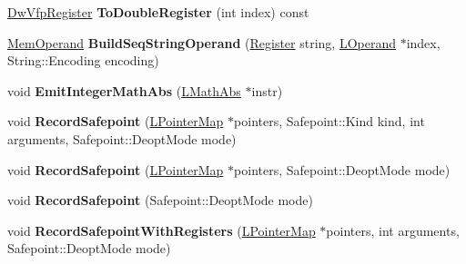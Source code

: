 \begin{DoxyCompactItemize}
\item 
\hyperlink{structv8_1_1internal_1_1_double_register}{Dw\+Vfp\+Register} {\bfseries To\+Double\+Register} (int index) const \hypertarget{classv8_1_1internal_1_1_l_code_gen_a371876b861c4031096e632a0af70b549}{}\label{classv8_1_1internal_1_1_l_code_gen_a371876b861c4031096e632a0af70b549}

\item 
\hyperlink{classv8_1_1internal_1_1_mem_operand}{Mem\+Operand} {\bfseries Build\+Seq\+String\+Operand} (\hyperlink{structv8_1_1internal_1_1_register}{Register} string, \hyperlink{classv8_1_1internal_1_1_l_operand}{L\+Operand} $\ast$index, String\+::\+Encoding encoding)\hypertarget{classv8_1_1internal_1_1_l_code_gen_a20aee7187252d655324a448e52b821d2}{}\label{classv8_1_1internal_1_1_l_code_gen_a20aee7187252d655324a448e52b821d2}

\item 
void {\bfseries Emit\+Integer\+Math\+Abs} (\hyperlink{classv8_1_1internal_1_1_l_math_abs}{L\+Math\+Abs} $\ast$instr)\hypertarget{classv8_1_1internal_1_1_l_code_gen_a47f49c0b36ce0adea0f302d6d3e44716}{}\label{classv8_1_1internal_1_1_l_code_gen_a47f49c0b36ce0adea0f302d6d3e44716}

\item 
void {\bfseries Record\+Safepoint} (\hyperlink{classv8_1_1internal_1_1_l_pointer_map}{L\+Pointer\+Map} $\ast$pointers, Safepoint\+::\+Kind kind, int arguments, Safepoint\+::\+Deopt\+Mode mode)\hypertarget{classv8_1_1internal_1_1_l_code_gen_a5c5e6c0360111f74e6c274c456c70b74}{}\label{classv8_1_1internal_1_1_l_code_gen_a5c5e6c0360111f74e6c274c456c70b74}

\item 
void {\bfseries Record\+Safepoint} (\hyperlink{classv8_1_1internal_1_1_l_pointer_map}{L\+Pointer\+Map} $\ast$pointers, Safepoint\+::\+Deopt\+Mode mode)\hypertarget{classv8_1_1internal_1_1_l_code_gen_a7f742e0bc068c384673a3490e15b230c}{}\label{classv8_1_1internal_1_1_l_code_gen_a7f742e0bc068c384673a3490e15b230c}

\item 
void {\bfseries Record\+Safepoint} (Safepoint\+::\+Deopt\+Mode mode)\hypertarget{classv8_1_1internal_1_1_l_code_gen_a3621dccea782082b57057f617a9dd24a}{}\label{classv8_1_1internal_1_1_l_code_gen_a3621dccea782082b57057f617a9dd24a}

\item 
void {\bfseries Record\+Safepoint\+With\+Registers} (\hyperlink{classv8_1_1internal_1_1_l_pointer_map}{L\+Pointer\+Map} $\ast$pointers, int arguments, Safepoint\+::\+Deopt\+Mode mode)\hypertarget{classv8_1_1internal_1_1_l_code_gen_a15c074803ff1d0270234efb3e8830c75}{}\label{classv8_1_1internal_1_1_l_code_gen_a15c074803ff1d0270234efb3e8830c75}


\end{DoxyCompactItemize}
